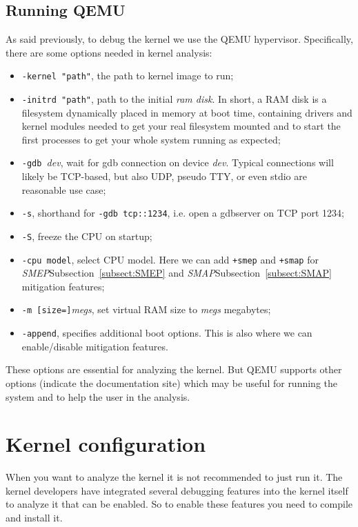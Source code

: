 \documentclass{masterthesis}
\newcommand{\refToSubSection}[1]{Subsection~\ref{subsect:#1}\xspace}
\begin{document}
\subsection{Running QEMU}
\label{subsect:QEMU}
As said previously, to debug the kernel we use the QEMU hypervisor. Specifically, there are some options needed in kernel analysis:
\begin{itemize}
\item \texttt{-kernel  "path"}, the path to kernel image to run;
\item \texttt{-initrd "path"}, path to the initial \emph{ram disk}. In short, a RAM disk is a filesystem dynamically placed in memory at boot time, containing drivers and kernel modules needed to get your real filesystem mounted and to start the first processes to get your whole system running as expected;
\item \texttt{-gdb }\textit{dev}, wait for gdb connection on device \textit{dev}. Typical connections will likely be TCP-based, but also UDP, pseudo TTY, or even stdio are reasonable use case;
\item \texttt{-s}, shorthand for \texttt{-gdb tcp::1234}, i.e. open a gdbserver on TCP port 1234;
\item \texttt{-S}, freeze the CPU on startup;
\item \texttt{-cpu model}, select CPU model. Here we can add \texttt{+smep} and \texttt{+smap} for \emph{SMEP}\refToSubSection{SMEP} and \emph{SMAP}\refToSubSection{SMAP} mitigation features;
\item \texttt{-m [size=]}\textit{megs}, set virtual RAM size to \textit{megs} megabytes;
\item \texttt{-append}, specifies additional boot options. This is also where we can enable/disable mitigation features.
\end{itemize}
These options are essential for analyzing the kernel. But QEMU supports other options (indicate the documentation site) which may be useful for running the system and to help the user in the analysis.
\section{Kernel configuration}
\label{sect:configuration}
When you want to analyze the kernel it is not recommended to just run it. The kernel developers have integrated several debugging features into the kernel itself to analyze it that can be enabled.
So to enable these features you need to compile and install it.
\end{document}
